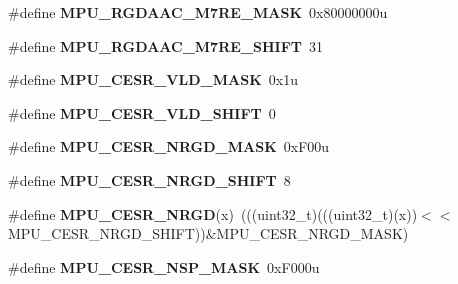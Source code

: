 \begin{DoxyCompactItemize}
\item 
\#define {\bfseries M\+P\+U\+\_\+\+R\+G\+D\+A\+A\+C\+\_\+\+M7\+R\+E\+\_\+\+M\+A\+SK}~0x80000000u\hypertarget{group__MPU__Register__Masks_ga91e2f6e31b038f7103f4824968045be5}{}\label{group__MPU__Register__Masks_ga91e2f6e31b038f7103f4824968045be5}

\item 
\#define {\bfseries M\+P\+U\+\_\+\+R\+G\+D\+A\+A\+C\+\_\+\+M7\+R\+E\+\_\+\+S\+H\+I\+FT}~31\hypertarget{group__MPU__Register__Masks_ga2ca22b48cd61a2b77f11fd0d41b0e475}{}\label{group__MPU__Register__Masks_ga2ca22b48cd61a2b77f11fd0d41b0e475}

\item 
\#define {\bfseries M\+P\+U\+\_\+\+C\+E\+S\+R\+\_\+\+V\+L\+D\+\_\+\+M\+A\+SK}~0x1u\hypertarget{group__MPU__Register__Masks_ga97170048bb44b005879eac9ef8db2c14}{}\label{group__MPU__Register__Masks_ga97170048bb44b005879eac9ef8db2c14}

\item 
\#define {\bfseries M\+P\+U\+\_\+\+C\+E\+S\+R\+\_\+\+V\+L\+D\+\_\+\+S\+H\+I\+FT}~0\hypertarget{group__MPU__Register__Masks_ga78bad194c9de3bebb9eba101cf58c613}{}\label{group__MPU__Register__Masks_ga78bad194c9de3bebb9eba101cf58c613}

\item 
\#define {\bfseries M\+P\+U\+\_\+\+C\+E\+S\+R\+\_\+\+N\+R\+G\+D\+\_\+\+M\+A\+SK}~0x\+F00u\hypertarget{group__MPU__Register__Masks_gab2bc6f6060eddc0403a79f7f5e31f270}{}\label{group__MPU__Register__Masks_gab2bc6f6060eddc0403a79f7f5e31f270}

\item 
\#define {\bfseries M\+P\+U\+\_\+\+C\+E\+S\+R\+\_\+\+N\+R\+G\+D\+\_\+\+S\+H\+I\+FT}~8\hypertarget{group__MPU__Register__Masks_ga30493ea4dcacc6d2bf116459dd57362e}{}\label{group__MPU__Register__Masks_ga30493ea4dcacc6d2bf116459dd57362e}

\item 
\#define {\bfseries M\+P\+U\+\_\+\+C\+E\+S\+R\+\_\+\+N\+R\+GD}(x)~(((uint32\+\_\+t)(((uint32\+\_\+t)(x))$<$$<$M\+P\+U\+\_\+\+C\+E\+S\+R\+\_\+\+N\+R\+G\+D\+\_\+\+S\+H\+I\+FT))\&M\+P\+U\+\_\+\+C\+E\+S\+R\+\_\+\+N\+R\+G\+D\+\_\+\+M\+A\+SK)\hypertarget{group__MPU__Register__Masks_ga5e4ddcc102a418d506925d0da3bc09e6}{}\label{group__MPU__Register__Masks_ga5e4ddcc102a418d506925d0da3bc09e6}

\item 
\#define {\bfseries M\+P\+U\+\_\+\+C\+E\+S\+R\+\_\+\+N\+S\+P\+\_\+\+M\+A\+SK}~0x\+F000u\hypertarget{group__MPU__Register__Masks_gadfa15098e24cc47d3c919a4a50702050}{}\label{group__MPU__Register__Masks_gadfa15098e24cc47d3c919a4a50702050}


\end{DoxyCompactItemize}
